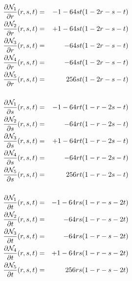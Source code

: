 \begin{eqnarray}
\frac{\partial {\mathcal{N}}_1}{\partial r}(r,s,t) &=& -1 - 64st(1-2r-s-t) \nonumber\\
\frac{\partial {\mathcal{N}}_2}{\partial r}(r,s,t) &=& +1 - 64st(1-2r-s-t) \nonumber\\
\frac{\partial {\mathcal{N}}_3}{\partial r}(r,s,t) &=&    - 64st(1-2r-s-t) \nonumber\\
\frac{\partial {\mathcal{N}}_4}{\partial r}(r,s,t) &=&    - 64st(1-2r-s-t) \nonumber\\
\frac{\partial {\mathcal{N}}_5}{\partial r}(r,s,t) &=&     256st(1-2r-s-t) \nonumber\\ \nonumber\\ 
\frac{\partial {\mathcal{N}}_1}{\partial s}(r,s,t) &=& -1 - 64rt(1-r-2s-t) \nonumber\\
\frac{\partial {\mathcal{N}}_2}{\partial s}(r,s,t) &=&    - 64rt(1-r-2s-t) \nonumber\\
\frac{\partial {\mathcal{N}}_3}{\partial s}(r,s,t) &=& +1 - 64rt(1-r-2s-t) \nonumber\\
\frac{\partial {\mathcal{N}}_4}{\partial s}(r,s,t) &=&    - 64rt(1-r-2s-t) \nonumber\\
\frac{\partial {\mathcal{N}}_5}{\partial s}(r,s,t) &=&     256rt(1-r-2s-t) \nonumber\\ \nonumber\\ 
\frac{\partial {\mathcal{N}}_1}{\partial t}(r,s,t) &=& -1 - 64rs(1-r-s-2t) \nonumber\\
\frac{\partial {\mathcal{N}}_2}{\partial t}(r,s,t) &=&    - 64rs(1-r-s-2t) \nonumber\\
\frac{\partial {\mathcal{N}}_3}{\partial t}(r,s,t) &=&    - 64rs(1-r-s-2t) \nonumber\\
\frac{\partial {\mathcal{N}}_4}{\partial t}(r,s,t) &=& +1 - 64rs(1-r-s-2t) \nonumber\\
\frac{\partial {\mathcal{N}}_5}{\partial t}(r,s,t) &=&     256rs(1-r-s-2t) \nonumber
\end{eqnarray}

